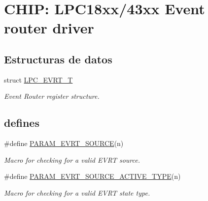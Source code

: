 \hypertarget{group___e_v_r_t__18_x_x__43_x_x}{}\section{C\+H\+IP\+: L\+P\+C18xx/43xx Event router driver}
\label{group___e_v_r_t__18_x_x__43_x_x}
\subsection*{Estructuras de datos}
\begin{DoxyCompactItemize}
\item 
struct \hyperlink{struct_l_p_c___e_v_r_t___t}{L\+P\+C\+\_\+\+E\+V\+R\+T\+\_\+T}
\begin{DoxyCompactList}\small\item\em Event Router register structure. \end{DoxyCompactList}\end{DoxyCompactItemize}
\subsection*{\textquotesingle{}defines\textquotesingle{}}
\begin{DoxyCompactItemize}
\item 
\#define \hyperlink{group___e_v_r_t__18_x_x__43_x_x_ga2475491cb73d4089705caa28008c8634}{P\+A\+R\+A\+M\+\_\+\+E\+V\+R\+T\+\_\+\+S\+O\+U\+R\+CE}(n)
\begin{DoxyCompactList}\small\item\em Macro for checking for a valid E\+V\+RT source. \end{DoxyCompactList}\item 
\#define \hyperlink{group___e_v_r_t__18_x_x__43_x_x_ga258c7be7764bf695a3e958d2caee184a}{P\+A\+R\+A\+M\+\_\+\+E\+V\+R\+T\+\_\+\+S\+O\+U\+R\+C\+E\+\_\+\+A\+C\+T\+I\+V\+E\+\_\+\+T\+Y\+PE}(n)
\begin{DoxyCompactList}\small\item\em Macro for checking for a valid E\+V\+RT state type. \end{DoxyCompactList}\end{DoxyCompactItemize}
